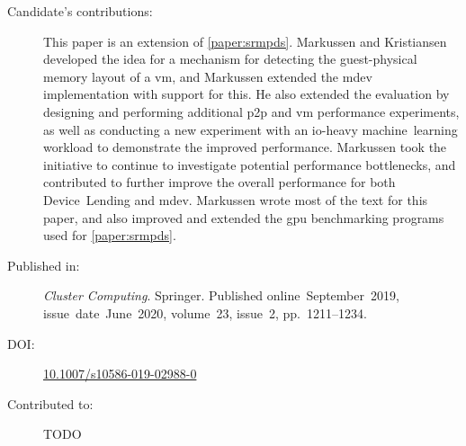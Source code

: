 \begin{description}
	\item[Candidate's contributions:]
		This paper is an extension of \cref{paper:srmpds}.
		Markussen and Kristiansen developed the idea for a mechanism for detecting the guest-physical memory layout of a \acrshort{vm}, and Markussen
		extended the \acrshort{mdev} implementation with support for this.
		He also extended the evaluation by designing and performing additional \acrshort{p2p} and \acrshort{vm} performance experiments,
		as well as conducting a new experiment with an \gls{io}-heavy machine~learning workload to demonstrate the improved performance.
		Markussen took the initiative to continue to investigate potential performance bottlenecks, and contributed to further improve the overall performance for both Device~Lending and \acrshort{mdev}.
		Markussen wrote most of the text for this paper, and also improved and extended the \acrshort{gpu} benchmarking programs used
		for \cref{paper:srmpds}.


	\item[Published in:]
		\emph{Cluster Computing}. Springer.
		Published online~September~2019,
		issue~date~June~2020,
		volume~23, issue~2, pp.~1211--1234.

	\item[DOI:] \href{https://doi.org/10.1007/s10586-019-02988-0}{10.1007/s10586-019-02988-0}

	\item[Contributed to:]
		TODO

\end{description}

